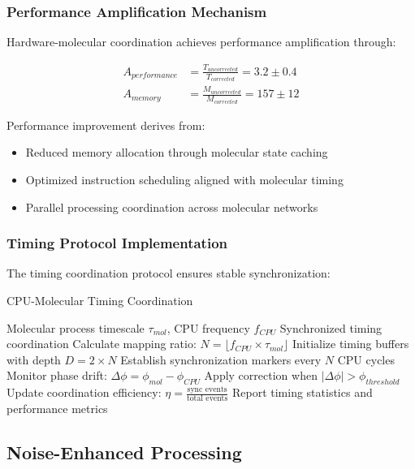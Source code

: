 \documentclass[12pt,a4paper]{article}
\begin{document}
\subsubsection{Performance Amplification Mechanism}

Hardware-molecular coordination achieves performance amplification through:

\begin{align}
A_{performance} &= \frac{T_{uncorrected}}{T_{corrected}} = 3.2 \pm 0.4 \\
A_{memory} &= \frac{M_{uncorrected}}{M_{corrected}} = 157 \pm 12
\end{align}

Performance improvement derives from:
\begin{itemize}
\item Reduced memory allocation through molecular state caching
\item Optimized instruction scheduling aligned with molecular timing
\item Parallel processing coordination across molecular networks
\end{itemize}

\subsubsection{Timing Protocol Implementation}

The timing coordination protocol ensures stable synchronization:

\begin{algorithm}[H]
\caption{CPU-Molecular Timing Coordination}
\begin{algorithmic}[1]
\REQUIRE Molecular process timescale $\tau_{mol}$, CPU frequency $f_{CPU}$
\ENSURE Synchronized timing coordination
\STATE Calculate mapping ratio: $N = \lfloor f_{CPU} \times \tau_{mol} \rfloor$
\STATE Initialize timing buffers with depth $D = 2 \times N$
\STATE Establish synchronization markers every $N$ CPU cycles
\STATE Monitor phase drift: $\Delta\phi = \phi_{mol} - \phi_{CPU}$
\STATE Apply correction when $|\Delta\phi| > \phi_{threshold}$
\STATE Update coordination efficiency: $\eta = \frac{\text{sync events}}{\text{total events}}$
\STATE Report timing statistics and performance metrics
\end{algorithmic}
\end{algorithm}

\subsection{Noise-Enhanced Processing}
\end{document}
